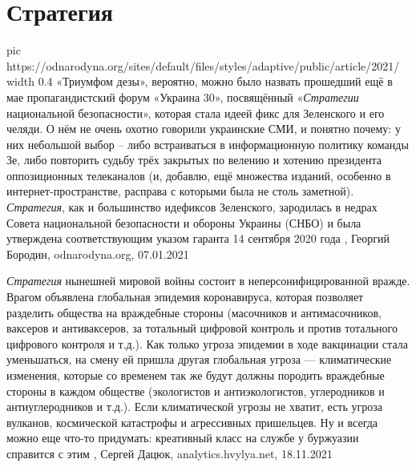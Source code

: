  
 
 
 
 
\chapter{Стратегия}
\label{sec:slova.strategia}

\ifcmt
  pic https://odnarodyna.org/sites/default/files/styles/adaptive/public/article/2021/%
	width 0.4
\fi
«Триумфом дезы», вероятно, можно было назвать прошедший ещё в мае
пропагандистский форум «Украина 30», посвящённый «\emph{Стратегии} национальной
безопасности», которая стала идеей фикс для Зеленского и его челяди. О нём не
очень охотно говорили украинские СМИ, и понятно почему: у них небольшой выбор –
либо встраиваться в информационную политику команды Зе, либо повторить судьбу
трёх закрытых по велению и хотению президента оппозиционных телеканалов (и,
добавлю, ещё множества изданий, особенно в интернет-пространстве, расправа с
которыми была не столь заметной).  \emph{Стратегия}, как и большинство
идефиксов Зеленского, зародилась в недрах Совета национальной безопасности и
обороны Украины (СНБО) и была утверждена соответствующим указом гаранта 14
сентября 2020 года
, Георгий Бородин, odnarodyna.org, 07.01.2021

\emph{Стратегия} нынешней мировой войны состоит в неперсонифицированной вражде. Врагом
объявлена глобальная эпидемия коронавируса, которая позволяет разделить
общества на враждебные стороны (масочников и антимасочников, ваксеров и
антиваксеров, за тотальный цифровой контроль и против тотального цифрового
контроля и т.д.).  Как только угроза эпидемии в ходе вакцинации стала
уменьшаться, на смену ей пришла другая глобальная угроза — климатические
изменения, которые со временем так же будут должны породить враждебные стороны
в каждом обществе (экологистов и антиэкологистов, углеродников и
антиуглеродников и т.д.).  Если климатической угрозы не хватит, есть угроза
вулканов, космической катастрофы и агрессивных пришельцев. Ну и всегда можно
еще что-то придумать: креативный класс на службе у буржуазии справится с этим
, Сергей Дацюк, analytics.hvylya.net, 18.11.2021

